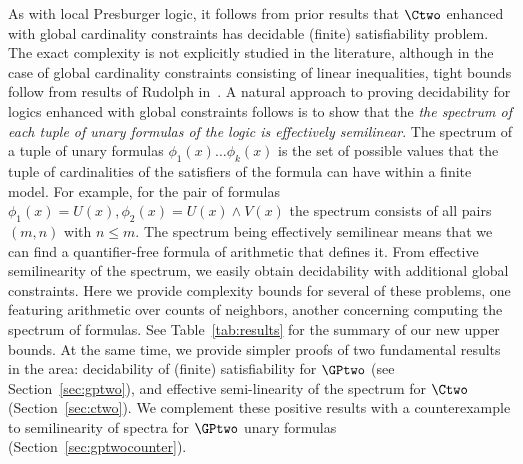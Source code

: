 As with local Presburger logic, it follows from prior results  that $\Ctwo$ enhanced with global cardinality constraints has decidable (finite) satisfiability problem.
The exact complexity is not explicitly studied in the literature,  although in the case of global cardinality constraints consisting of linear inequalities, tight bounds follow from results of Rudolph in~\cite{rudolphcardinality}.    A natural approach to proving decidability for logics
enhanced with global constraints follows is to show that the \emph{the spectrum of each tuple of unary formulas of the logic is effectively semilinear}. The spectrum of a tuple of unary formulas $\phi_1(x) \ldots \phi_k(x)$ is the set of possible values that the tuple of cardinalities of the satisfiers of the formula can have within a finite model. For example, for the pair of formulas $\phi_1(x)=U(x), \phi_2(x)= U(x) \wedge V(x)$ the spectrum consists of all pairs $(m, n)$ with $n \leq m$. The spectrum being effectively semilinear means that we can find a quantifier-free formula of arithmetic that defines it. From effective semilinearity of the spectrum, we easily obtain decidability with additional global constraints.
Here we provide  complexity bounds for several of these problems, one featuring  arithmetic over counts of neighbors, another concerning computing the spectrum of formulas. 
See Table~\ref{tab:results} for the summary of our new upper bounds.
At the same time, we provide simpler proofs of two fundamental results in the area: decidability of (finite) satisfiability for $\GPtwo$ (see Section~\ref{sec:gptwo}), and effective semi-linearity of the spectrum for $\Ctwo$ (Section~\ref{sec:ctwo}). We complement these positive results with a counterexample to semilinearity of spectra for $\GPtwo$ unary formulas (Section~\ref{sec:gptwocounter}).
